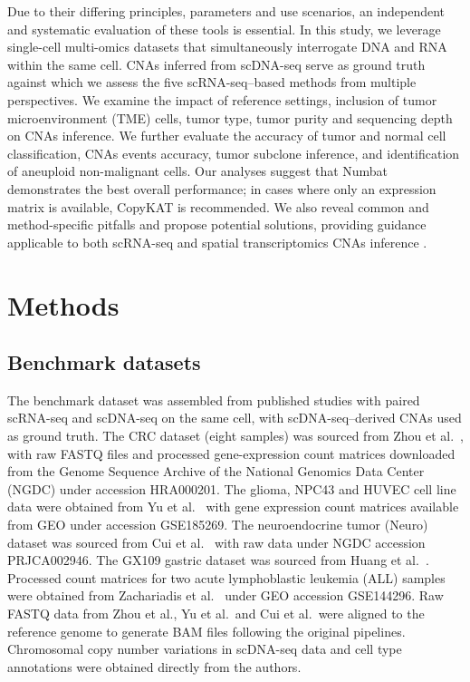 \documentclass[11pt]{article}
\begin{document}
Due to their differing principles, parameters and use scenarios, an independent and systematic evaluation of these tools is essential. In this study, we leverage single-cell multi-omics datasets that simultaneously interrogate DNA and RNA within the same cell. CNAs inferred from scDNA-seq serve as ground truth against which we assess the five scRNA-seq--based methods from multiple perspectives. We examine the impact of reference settings, inclusion of tumor microenvironment (TME) cells, tumor type, tumor purity and sequencing depth on CNAs inference. We further evaluate the accuracy of tumor and normal cell classification, CNAs events accuracy, tumor subclone inference, and identification of aneuploid non-malignant cells. Our analyses suggest that Numbat demonstrates the best overall performance; in cases where only an expression matrix is available, CopyKAT is recommended. We also reveal common and method-specific pitfalls and propose potential solutions, providing guidance applicable to both scRNA-seq and spatial transcriptomics CNAs inference \citep{erickson2022spatial}.

\section{Methods}

\subsection{Benchmark datasets}
The benchmark dataset was assembled from published studies with paired scRNA-seq and scDNA-seq on the same cell, with scDNA-seq--derived CNAs used as ground truth. The CRC dataset (eight samples) was sourced from Zhou et al.\ \citep{zhou2023crc}, with raw FASTQ files and processed gene-expression count matrices downloaded from the Genome Sequence Archive of the National Genomics Data Center (NGDC) under accession HRA000201. The glioma, NPC43 and HUVEC cell line data were obtained from Yu et al.\ \citep{yu2023npc} with gene expression count matrices available from GEO under accession GSE185269. The neuroendocrine tumor (Neuro) dataset was sourced from Cui et al.\ \citep{cui2021neuroendocrine} with raw data under NGDC accession PRJCA002946. The GX109 gastric dataset was sourced from Huang et al.\ \citep{huang2023gastric}. Processed count matrices for two acute lymphoblastic leukemia (ALL) samples were obtained from Zachariadis et al.\ \citep{zachariadis2020all} under GEO accession GSE144296. Raw FASTQ data from Zhou et al., Yu et al.\ and Cui et al.\ were aligned to the reference genome to generate BAM files following the original pipelines. Chromosomal copy number variations in scDNA-seq data and cell type annotations were obtained directly from the authors.
\end{document}

